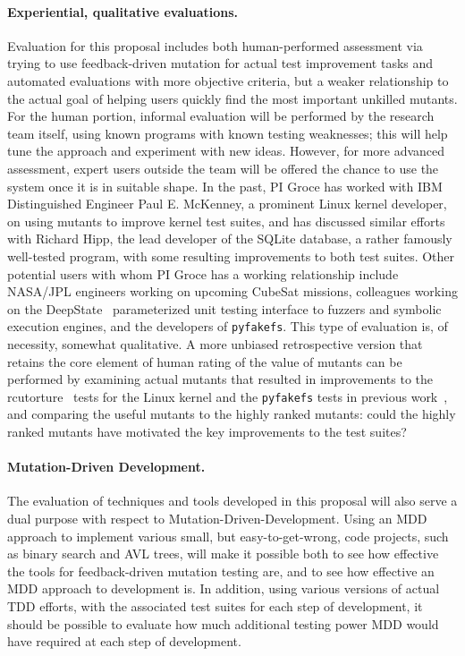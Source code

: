 \paragraph{Experiential, qualitative evaluations.}
Evaluation for this proposal includes both human-performed assessment
via trying to use feedback-driven mutation for actual test improvement
tasks and automated evaluations with more objective criteria, but a
weaker relationship to the actual goal of helping users quickly find
the most important unkilled mutants.  For the human portion, informal
evaluation will be performed by the research team itself, using known
programs with known testing weaknesses; this will help tune the
approach and experiment with new ideas.  However, for more advanced
assessment, expert users outside the team will be offered the chance
to use the system once it is in suitable shape.  In the past, PI Groce
has worked with IBM Distinguished Engineer Paul E. McKenney, a
prominent Linux kernel developer, on using mutants to improve kernel
test suites, and has discussed similar efforts with Richard Hipp, the
lead developer of the SQLite database, a rather famously well-tested
program, with some resulting improvements to both test suites.  Other
potential users with whom PI Groce has a working relationship include  NASA/JPL engineers working on upcoming CubeSat
missions, colleagues working on the DeepState~\cite{DeepState}
parameterized unit testing interface to fuzzers and symbolic execution
engines, and the developers of {\tt pyfakefs}.  This type of
evaluation is, of necessity, somewhat qualitative.  A more unbiased retrospective
version that retains the core element of human rating of the value of mutants can be performed by examining actual mutants that resulted in
improvements to the rcutorture~\cite{rcutorture} tests for the Linux
kernel and the {\tt pyfakefs} tests in previous
work~\cite{groce2018verified}, and comparing the useful mutants to the
highly ranked mutants:  could the highly ranked mutants have motivated
the key improvements to the test suites?


\paragraph{Mutation-Driven Development.}
The evaluation of techniques and tools developed in this proposal will
also serve a dual purpose with respect to
Mutation-Driven-Development.  Using an MDD approach to implement
various small, but easy-to-get-wrong, code projects, such as binary
search and AVL trees, will make it possible both to see how effective
the tools for feedback-driven mutation testing are, and to see how effective an MDD approach to development is.  In
addition, using various versions of actual TDD efforts, with the
associated test suites for each step of development, it should be
possible to evaluate how much additional testing power MDD would have
required at each step of development.
